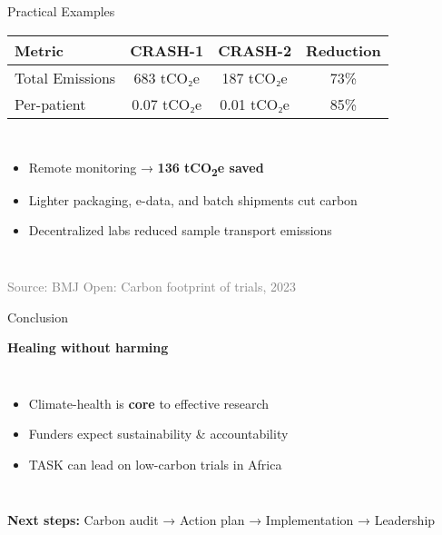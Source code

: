 \documentclass{beamer}
\newcommand{\highlight}[1]{\textcolor{taskred}{\textbf{#1}}}
\newcommand{\source}[1]{\vspace{0.3cm}\hfill\scriptsize\textcolor{gray}{Source: #1}}
\begin{document}
\begin{frame}{Practical Examples}
\begin{tcolorbox}[colback=white, colframe=taskblue, title=\textbf{CRASH Trials Carbon Reduction}]
\begin{tabular}{lccc}
\toprule
\textbf{Metric} & \textbf{CRASH-1} & \textbf{CRASH-2} & \textbf{Reduction} \\
\midrule
Total Emissions & 683 tCO₂e & 187 tCO₂e & 73\% \\
Per-patient & 0.07 tCO₂e & 0.01 tCO₂e & 85\% \\
\bottomrule
\end{tabular}
\end{tcolorbox}

\vspace{0.3cm}
\begin{columns}
\centering
{}
\begin{itemize}[spacing=0.5em]
    \item Remote monitoring → \highlight{136 tCO\textsubscript{2}e saved}
    \item Lighter packaging, e-data, and batch shipments cut carbon
    \item Decentralized labs reduced sample transport emissions
\end{itemize}
\end{columns}

\source{BMJ Open: Carbon footprint of trials, 2023}
\end{frame}

\begin{frame}{Conclusion}
\begin{center}
\Large\textbf{\textcolor{taskblue}{Healing without harming}}
\end{center}

\vspace{0.5cm}
\begin{columns}
\begin{itemize}[spacing=1em]
    \item Climate-health is \highlight{core} to effective research
    \item Funders expect sustainability \& accountability
    \item TASK can lead on low-carbon trials in Africa
\end{itemize}
\end{columns}

\begin{tcolorbox}[colback=taskblue!10, colframe=taskblue]
\centering
\textbf{Next steps:} Carbon audit → Action plan → Implementation → Leadership
\end{tcolorbox}
\end{frame}
\end{document}
